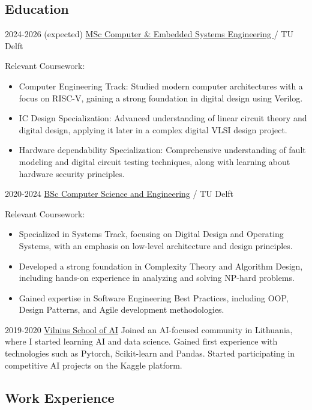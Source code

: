 \documentclass{article}
\begin{document}
\subsection{Education}
\cvitem
{2024-2026 (expected)}
{\href{https://www.tudelft.nl/onderwijs/opleidingen/masters/cese/msc-computer-embedded-systems-engineering}{MSc Computer \& Embedded Systems Engineering }}
{/ TU Delft}
{Relevant Coursework: 
\begin{itemize}
\setlength\itemsep{0.25em}
\item Computer Engineering Track: Studied modern computer architectures with a focus on RISC-V, gaining a strong foundation in digital design using Verilog.
\item IC Design Specialization: Advanced understanding of linear circuit theory and digital design, applying it later in a complex digital VLSI design project.
\item Hardware dependability Specialization: Comprehensive understanding of fault modeling and digital circuit testing techniques, along with learning about hardware security principles.
\end{itemize}
}
\cvitem
{2020-2024}
{\href{https://www.tudelft.nl/onderwijs/opleidingen/bachelors/cse/bsc-computer-science-and-engineering}{BSc Computer Science and Engineering}}
{/ TU Delft}
{Relevant Coursework:
\begin{itemize}
\setlength\itemsep{0.25em}
\item Specialized in Systems Track, focusing on Digital Design and Operating Systems, with an emphasis on low-level architecture and design principles.
\item Developed a strong foundation in Complexity Theory and Algorithm Design, including  hands-on experience in analyzing and solving NP-hard problems.
\item Gained expertise in Software Engineering Best Practices, including OOP, Design Patterns, and Agile development methodologies.
\end{itemize}
}
\cvitem
{2019-2020}
{\href{https://www.linkedin.com/school/vilnius-school-of-ai/?originalSubdomain=lt}{Vilnius School of AI}}
{}
{Joined an AI-focused community in Lithuania, where I started learning AI and data science. Gained first experience with technologies such as Pytorch, Scikit-learn and Pandas. Started participating in competitive AI projects on the Kaggle platform.}

\subsection{Work Experience}
\end{document}
